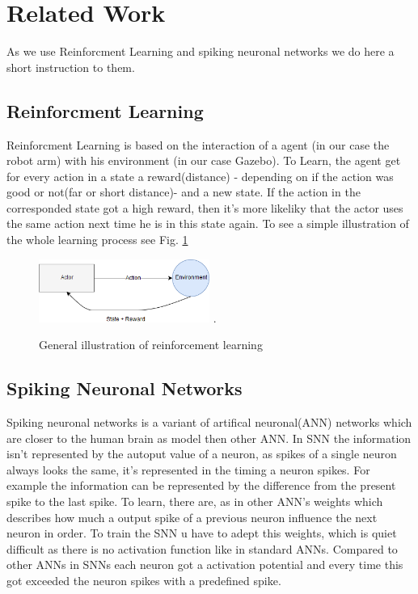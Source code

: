 \section{Related Work}%
As we use Reinforcment Learning and spiking neuronal networks we do here a short instruction to them.
\subsection{Reinforcment Learning}%
Reinforcment Learning is based on the interaction of a agent (in our case the robot arm) with his environment (in our case Gazebo). To Learn, the agent get for every action in a state a reward(distance) - depending on if the action was good or not(far or short distance)- and a new state. If the action in the corresponded state got a high reward, then it's more likeliky that the actor uses the same action next time he is in this state again. To see a simple illustration of the whole learning process see Fig. \ref{re_base}
\begin{figure}[H]
	\centering
	\includegraphics[width=2.2in]{img/re_base.png}
	\DeclareGraphicsExtensions.
	\caption{General illustration of reinforcement learning}
	\label{re_base}
\end{figure}

\subsection{Spiking Neuronal Networks}%
Spiking neuronal networks is a variant of artifical neuronal(ANN) networks which are closer to the human brain as model then other ANN. In SNN the information isn't represented by the autoput value of a neuron, as spikes of a single neuron always looks the same, it's represented in the timing a neuron spikes. For example the information can be represented by the difference from the present spike to the last spike. To learn, there are, as in other ANN's weights which describes how much a output spike of a previous neuron influence the next neuron in order. To train the SNN u have to adept this weights, which is quiet difficult as there is no activation function like in standard ANNs. Compared to other ANNs in SNNs each neuron got a activation potential and every time this got exceeded the neuron spikes with a predefined spike.

